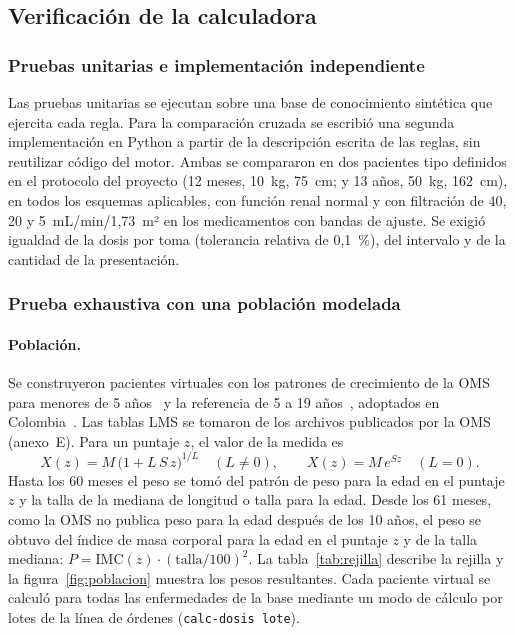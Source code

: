 \documentclass[11pt,a4paper]{article}
\newcommand{\codigo}[1]{\texttt{\small #1}}
\begin{document}
\subsection{Verificación de la calculadora}

\subsubsection{Pruebas unitarias e implementación independiente}

Las pruebas unitarias se ejecutan sobre una base de conocimiento sintética que ejercita cada regla. Para la comparación cruzada se escribió una segunda implementación en Python a partir de la descripción escrita de las reglas, sin reutilizar código del motor. Ambas se compararon en dos pacientes tipo definidos en el protocolo del proyecto (12 meses, 10~kg, 75~cm; y 13 años, 50~kg, 162~cm), en todos los esquemas aplicables, con función renal normal y con filtración de 40, 20 y 5~mL/min/1,73~m² en los medicamentos con bandas de ajuste. Se exigió igualdad de la dosis por toma (tolerancia relativa de 0,1~\%), del intervalo y de la cantidad de la presentación.

\subsubsection{Prueba exhaustiva con una población modelada}

\paragraph{Población.} Se construyeron pacientes virtuales con los patrones de crecimiento de la OMS para menores de 5 años~\citep{mgrs2006} y la referencia de 5 a 19 años~\citep{deonis2007}, adoptados en Colombia~\citep{res2465}. Las tablas LMS se tomaron de los archivos publicados por la OMS (anexo~E). Para un puntaje $z$, el valor de la medida es~\citep{cole1992}
\begin{equation}
X(z) = M\,\big(1 + L\,S\,z\big)^{1/L} \quad (L \neq 0), \qquad X(z) = M\,e^{S z} \quad (L = 0).
\end{equation}
Hasta los 60 meses el peso se tomó del patrón de peso para la edad en el puntaje $z$ y la talla de la mediana de longitud o talla para la edad. Desde los 61 meses, como la OMS no publica peso para la edad después de los 10 años, el peso se obtuvo del índice de masa corporal para la edad en el puntaje $z$ y de la talla mediana: $P = \text{IMC}(z) \cdot (\text{talla}/100)^2$. La tabla~\ref{tab:rejilla} describe la rejilla y la figura~\ref{fig:poblacion} muestra los pesos resultantes. Cada paciente virtual se calculó para todas las enfermedades de la base mediante un modo de cálculo por lotes de la línea de órdenes (\codigo{calc-dosis lote}).
\end{document}
